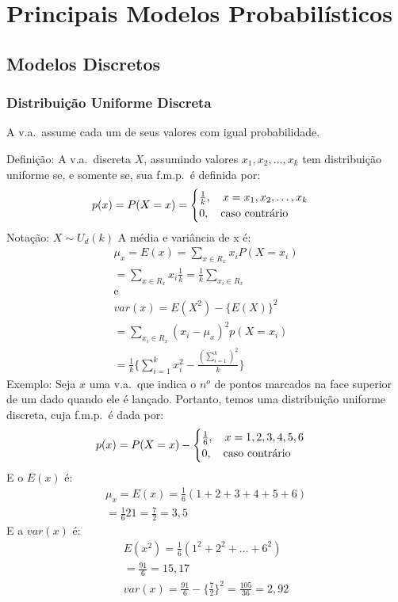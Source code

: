 \chapter{Principais Modelos Probabilísticos}
 \section{Modelos Discretos}
 \subsection{Distribuição Uniforme Discreta}
 A v.a.\ assume cada um de seus valores com igual probabilidade.

 Definição: A v.a.\ discreta $X$, assumindo valores $x_1,x_2,\dots,x_k$ tem 
 distribuição uniforme se, e somente se, sua f.m.p.\ é definida por: 
 \begin{align}
   p(x)=P(X=x)=\begin{cases}
     \frac{1}{k}, \text{\quad} x=x_1,x_2,\dots,x_k\\
     0, \text{\quad caso contrário}
   \end{cases}
 \end{align}
 Notação: $X \sim U_{d}(k)$
 A média e variância de x é:
 \begin{align}
   \mu_{x}=E(x)=\sum_{x \in R_{x}}x_i P(X=x_i)\\
   = \sum_{x \in R_{x}}x_i \frac{1}{k}= \frac{1}{k}\sum_{x_i \in R_{x}}\\
   \text{e}\\
   var(x)=E(X^2)-\{E(X)\}^2\\
   = \sum_{x_i \in R_{x}}(x_i -\mu_x )^2 p(X=x_i)\\
   =\frac{1}{k} \{\sum^k_{i=1} x_i^2 - \frac{(\sum_{i=1}^k)^2}{k}\}
 \end{align}
 Exemplo: Seja $x$ uma v.a.\ que indica o $n^o$ de pontos marcados na face 
 superior de um dado quando ele é lançado. Portanto, temos uma distribuição 
 uniforme discreta, cuja f.m.p.\ é dada por: 
 \begin{align}
   p(x)=P(X=x)-\begin{cases}
     \frac{1}{6},\text{\quad} x=1,2,3,4,5,6\\
     0, \text{\quad caso contrário}
   \end{cases}
 \end{align}
 E o $E(x)$ é: 
 \begin{align}
   \mu_{x}=E(x)=\frac{1}{6}(1+2+3+4+5+6)\\
   =\frac{1}{6}21= \frac{7}{2}=3,5
 \end{align}
 E a $var(x)$ é:
 \begin{align}
   E(x^2)=\frac{1}{6}(1^2 + 2^2 + \dots + 6^2)\\
   =\frac{91}{6}=15,17\\
   var(x)=\frac{91}{6}- \{\frac{7}{2}\}^2=\frac{105}{36}=2,92
 \end{align}
